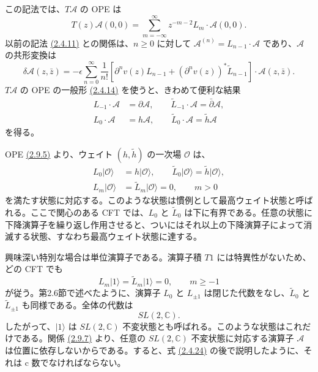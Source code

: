 この記法では、$T\mathcal A$ の OPE は
\begin{equation}
T(z)\mathcal A(0,0)=\sum_{m=-\infty}^\infty
z^{-m-2}L_m\cdot\mathcal A(0,0).
\tag{2.9.5}\label{eq:2.9.5}
\end{equation}
以前の記法 \hyperref[eq:2.4.11]{(2.4.11)} との関係は、$n\geq0$ に対して $\mathcal A^{(n)}=L_{n-1}\cdot\mathcal A$ であり、$\mathcal A$ の共形変換は
\begin{equation}
\delta\mathcal A(z,\bar z)
=-\epsilon\sum_{n=0}^\infty\frac1{n!}
\left[\partial^nv(z)L_{n-1}
+(\partial^nv(z))^*\widetilde L_{n-1}\right]\cdot\mathcal A(z,\bar z).
\tag{2.9.6}\label{eq:2.9.6}
\end{equation}
$T\mathcal A$ の OPE の一般形 \hyperref[eq:2.4.14]{(2.4.14)} を使うと、きわめて便利な結果
\begin{align}
L_{-1}\cdot\mathcal A&=\partial\mathcal A,\qquad
\widetilde L_{-1}\cdot\mathcal A=\bar\partial\mathcal A,
\tag{2.9.7a}\label{eq:2.9.7a}\\
L_0\cdot\mathcal A&=h\mathcal A,\qquad
\widetilde L_0\cdot\mathcal A=\widetilde h\mathcal A
\tag{2.9.7b}\label{eq:2.9.7b}
\end{align}
を得る。

OPE \hyperref[eq:2.9.5]{(2.9.5)} より、ウェイト $(h,\widetilde h)$ の一次場 $\mathcal O$ は、
\begin{align}
L_0\lvert\mathcal O\rangle&=h\lvert\mathcal O\rangle,\qquad
\widetilde L_0\lvert\mathcal O\rangle=\widetilde h\lvert\mathcal O\rangle,
\tag{2.9.8a}\label{eq:2.9.8a}\\
L_m\lvert\mathcal O\rangle&=\widetilde L_m\lvert\mathcal O\rangle=0,
\qquad m>0
\tag{2.9.8b}\label{eq:2.9.8b}
\end{align}
を満たす状態に対応する。このような状態は慣例として最高ウェイト状態と呼ばれる。ここで関心のある CFT では、$L_0$ と $\widetilde L_0$ は下に有界である。任意の状態に下降演算子を繰り返し作用させると、ついにはそれ以上の下降演算子によって消滅する状態、すなわち最高ウェイト状態に達する。

興味深い特別な場合は単位演算子である。演算子積 $T1$ には特異性がないため、どの CFT でも
\begin{equation}
L_m\lvert1\rangle=\widetilde L_m\lvert1\rangle=0,
\qquad m\geq-1
\tag{2.9.9}\label{eq:2.9.9}
\end{equation}
が従う。第2.6節で述べたように、演算子 $L_0$ と $L_{\pm1}$ は閉じた代数をなし、$\widetilde L_0$ と $\widetilde L_{\pm1}$ も同様である。全体の代数は
\begin{equation}
SL(2,\mathbb C).
\tag{2.9.10}\label{eq:2.9.10}
\end{equation}
したがって、$\lvert1\rangle$ は $SL(2,\mathbb C)$ 不変状態とも呼ばれる。このような状態はこれだけである。関係 \hyperref[eq:2.9.7a]{(2.9.7)} より、任意の $SL(2,\mathbb C)$ 不変状態に対応する演算子 $\mathcal A$ は位置に依存しないからである。すると、式 \hyperref[eq:2.4.24]{(2.4.24)} の後で説明したように、それは c 数でなければならない。

